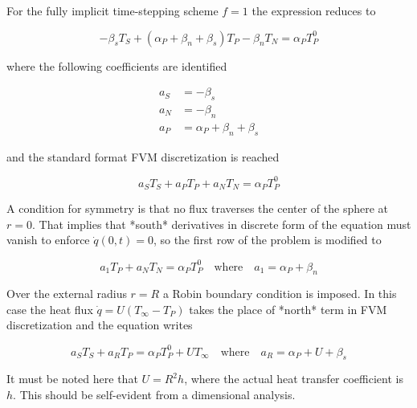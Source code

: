 \documentclass[oneside]{textbook}
\begin{document}
For the fully implicit time-stepping scheme $f=1$ the expression reduces to

\begin{equation}
-\beta_{s}T_S+
(\alpha_{P}+\beta_{n}+\beta_{s})T_P
-\beta_{n}T_N
=
\alpha_{P}T_P^{0}
\end{equation}

where the following coefficients are identified

\begin{equation}
\begin{aligned}
	a_{S} & = -\beta_{s}\\[8pt]
	a_{N} & = -\beta_{n}\\[8pt]
	a_{P} & = \alpha_{P}+\beta_{n}+\beta_{s}
\end{aligned}
\end{equation}

and the standard format FVM discretization is reached

\begin{equation}
a_ST_S + a_PT_P + a_NT_N = \alpha_{P}T_P^{0}
\end{equation}

A condition for symmetry is that no flux traverses the center of the sphere at $r=0$. That implies that *south* derivatives in discrete form of the equation must vanish to enforce $\dot{q}(0,t)=0$, so the first row of the problem is modified to

\begin{equation}
a_1T_P + a_NT_N = \alpha_{P}T_P^{0}\quad\text{where}\quad{}a_1=\alpha_{P}+\beta_{n}
\end{equation}

Over the external radius $r=R$ a Robin boundary condition is imposed. In this case the heat flux $\dot{q}=U(T_\infty-T_P)$ takes the place of *north* term in FVM discretization and the equation writes

\begin{equation}
a_ST_S + a_RT_P = \alpha_{P}T_P^{0}+UT_\infty\quad\text{where}\quad{}a_R=\alpha_{P}+U+\beta_{s}
\end{equation}

It must be noted here that $U=R^2h$, where the actual heat transfer coefficient is $h$. This should be self-evident from a dimensional analysis.


\printbibliography%

\appendix%

%


\printunsrtglossary[%
    type  = symbols,%
    style = long,%
]%
\end{document}
